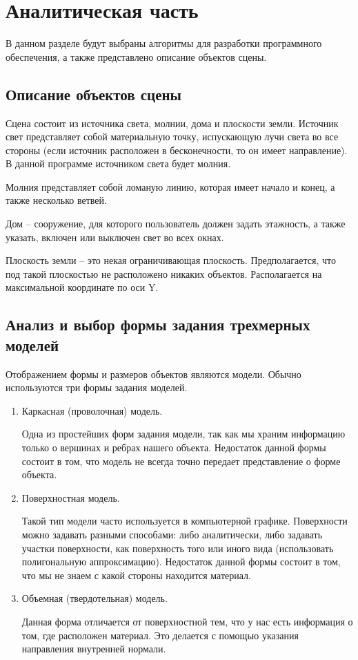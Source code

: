 \chapter{Аналитическая часть}
В данном разделе будут выбраны алгоритмы для разработки программного обеспечения, а также представлено описание объектов сцены.
\section{Описание объектов сцены}

Сцена состоит из источника света, молнии, дома и плоскости земли.
Источник свет представляет собой материальную точку, испускающую лучи света во все стороны (если источник расположен в бесконечности, то он имеет направление). В данной программе источником света будет молния.

Молния представляет собой ломаную линию, которая имеет начало и конец, а также несколько ветвей. 

Дом -- сооружение, для которого пользователь должен задать этажность, а также указать, включен или выключен свет во всех окнах.

Плоскость земли – это некая ограничивающая плоскость. Предполагается, что под такой плоскостью не расположено никаких объектов. Располагается на максимальной координате по оси Y. 


\section{Анализ и выбор формы задания трехмерных моделей}
Отображением формы и размеров объектов являются модели. 
Обычно используются три формы задания моделей.

\begin{enumerate}
	\item Каркасная (проволочная) модель.
	
	Одна из простейших форм задания модели, так как мы храним информацию только о вершинах и ребрах нашего объекта. Недостаток данной формы состоит в том, что модель не всегда точно передает представление о форме объекта.
	
	\item Поверхностная модель.
	
	Такой тип модели часто используется в компьютерной графике. Поверхности можно задавать разными способами: либо аналитически, либо задавать участки поверхности, как поверхность того или иного вида (использовать полигональную аппроксимацию). Недостаток данной формы состоит в том, что мы не знаем с какой стороны находится материал.
	
	\item  Объемная (твердотельная) модель.
	
	Данная форма отличается от поверхностной тем, что у нас есть информация о том, где расположен материал. Это делается с помощью указания направления внутренней нормали. 

\end{enumerate}

